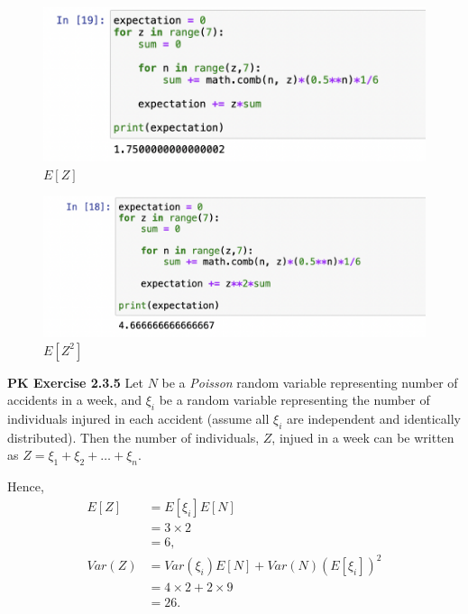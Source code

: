\documentclass{article}
\begin{document}
\begin{figure}[htb]
    \qquad
    \begin{minipage}{.4\textwidth}
        \centering
        {\includegraphics[scale=0.4]{E[Z].png}}
        \qquad\qquad$E[Z]$\label{fig:1}
    \end{minipage}    
    \qquad
    \begin{minipage}{.4\textwidth}
        \centering
        {\includegraphics[scale=0.4]{E[Z^2].png}}
        \qquad\qquad$E[Z^2]$\label{fig:2}
    \end{minipage}        
\end{figure} 
\bigbreak

\textbf{PK Exercise 2.3.5} 
Let $N$ be a \emph{Poisson} random variable representing number of accidents in a week, 
and $\xi_i$ be a random variable representing the number of individuals injured in each accident (assume all $\xi_i$ are independent and identically distributed).
Then the number of individuals, $Z$, injued in a week can be written as $Z = \xi_1 + \xi_2 + \dots + \xi_n$.

Hence, 
\begin{align}
    E[Z] & = E[\xi_i]E[N] \nonumber \\
    & = 3 \times 2 \nonumber \\
    & = 6, \nonumber \\
    Var(Z) & = Var(\xi_i)E[N] + Var(N)(E[\xi_i])^2 \nonumber \\
    & = 4\times 2 + 2\times 9 \nonumber \\
    & = 26. \nonumber
\end{align}
\bigbreak
\end{document}
